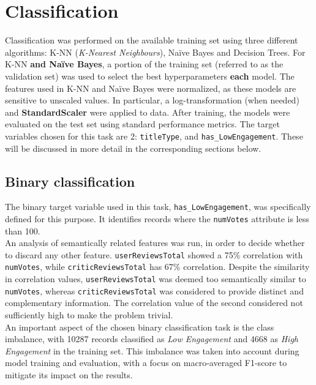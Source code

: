 
\chapter{Classification}
\label{ch:capitolo3}
Classification was performed on the available training set using three different algorithms: K-NN (\textit{K-Nearest Neighbours}), Naïve Bayes and Decision Trees.
For K-NN \textbf{and Naïve Bayes}, a portion of the training set (referred to as the validation set) was used to select the best hyperparameters \textbf{each} model.
The features used in K-NN and Naïve Bayes were normalized, as these models are sensitive to unscaled values.
In particular, a log-transformation (when needed) and \textbf{StandardScaler} were applied to data.
After training, the models were evaluated on the test set using standard performance metrics. 
The target variables chosen for this task are 2: \texttt{titleType}, and \texttt{has\_LowEngagement}.
These will be discussed in more detail in the corresponding sections below.

\section{Binary classification}\label{sec:binary_classification}
The binary target variable used in this task, \texttt{has\_LowEngagement}, was specifically defined for this purpose. 
It identifies records where the \texttt{numVotes} attribute is less than 100.\\

An analysis of semantically related features was run, in order to decide whether to discard any other feature.
\texttt{userReviewsTotal} showed a 75\% correlation with
\texttt{numVotes}, while \texttt{criticReviewsTotal} has 67\% correlation.
Despite the similarity in correlation
values, \texttt{userReviewsTotal} was deemed too semantically similar to \texttt{numVotes}, whereas
\texttt{criticReviewsTotal} was considered to provide distinct and complementary information.
The correlation value of the second considered not sufficiently high to make the problem trivial.\\

An important aspect of the chosen binary classification task is the class imbalance, with 10287 records
classified as \textit{Low Engagement} and 4668 as \textit{High Engagement} in the training set.
This imbalance was taken into account during model training and evaluation, with a focus on
macro-averaged F1-score to mitigate its impact on the results.\\

